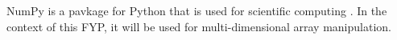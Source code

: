 NumPy is a pavkage for Python that is used for scientific computing \parencite{numpy}.
In the context of this FYP, it will be used for multi-dimensional array manipulation.